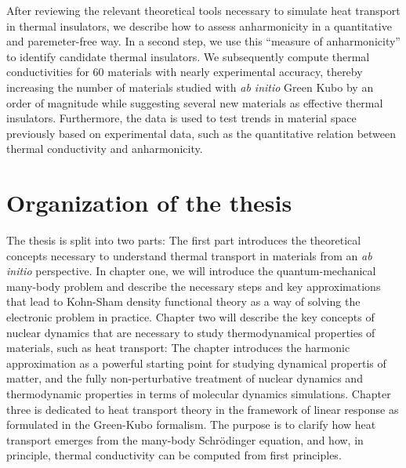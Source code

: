  After reviewing the relevant theoretical tools necessary to simulate heat transport in thermal insulators, we describe how to assess anharmonicity in a quantitative and paremeter-free way. 
In a second step, we use this ``measure of anharmonicity'' to identify candidate thermal insulators. We subsequently compute thermal conductivities for 60 materials with nearly experimental accuracy, thereby increasing the number of materials studied with \emph{ab initio} Green Kubo by an order of magnitude while suggesting several new materials as effective thermal insulators. Furthermore, the data is used to test trends in material space previously based on experimental data, such as the quantitative relation between thermal conductivity and anharmonicity.


\section*{Organization of the thesis}
The thesis is split into two parts: The first part introduces the theoretical concepts necessary to understand thermal transport in materials from an \emph{ab initio} perspective.
In chapter one, we will introduce the quantum-mechanical many-body problem and describe the necessary steps and key approximations that lead to Kohn-Sham density functional theory as a way of solving the electronic problem in practice. Chapter two will describe the key concepts of nuclear dynamics that are necessary to study thermodynamical properties of materials, such as heat transport: The chapter introduces the harmonic approximation as a powerful starting point for studying dynamical propertis of matter, and the fully non-perturbative treatment of nuclear dynamics and thermodynamic properties in terms of molecular dynamics simulations. Chapter three is dedicated to heat transport theory in the framework of linear response as formulated in the Green-Kubo formalism. The purpose is to clarify how heat transport emerges from the many-body Schr\"odinger equation, and how, in principle, thermal conductivity can be computed from first principles.

